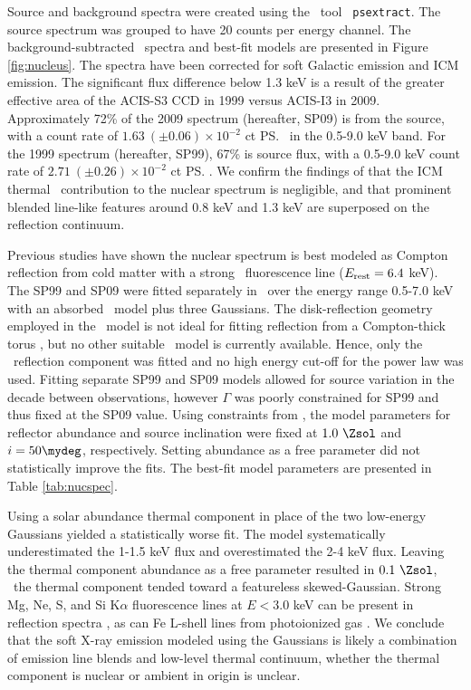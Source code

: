\documentclass[useAMS,usenatbib]{mn2e}
\begin{document}
Source and background spectra were created using the \ciao\ tool {\tt
  psextract}. The source spectrum was grouped to have 20 counts per
energy channel. The background-subtracted \chandra\ spectra and
best-fit models are presented in Figure \ref{fig:nucleus}. The spectra
have been corrected for soft Galactic emission and ICM emission. The
significant flux difference below 1.3 keV is a result of the greater
effective area of the ACIS-S3 CCD in 1999 versus ACIS-I3 in
2009. Approximately 72\% of the 2009 spectrum (hereafter, SP09) is
from the source, with a count rate of $1.63 ~(\pm 0.06) \times
10^{-2}$ ct \ps\ in the 0.5-9.0 keV band. For the 1999 spectrum
(hereafter, SP99), 67\% is source flux, with a 0.5-9.0 keV count rate
of $2.71 ~(\pm 0.26) \times 10^{-2}$ ct \ps. We confirm the findings
of \citet{2001MNRAS.321L..15I} that the ICM thermal
\feka\ contribution to the nuclear spectrum is negligible, and that
prominent blended line-like features around 0.8 keV and 1.3 keV are
superposed on the reflection continuum.

Previous studies have shown the nuclear spectrum is best modeled as
Compton reflection from cold matter with a strong \feka\ fluorescence
line ($E_{\rm{rest}} = 6.4$ keV). The SP99 and SP09 were fitted
separately in \xspec\ over the energy range 0.5-7.0 keV with an
absorbed \pexrav\ model \citep{pexrav} plus three Gaussians. The
disk-reflection geometry employed in the \pexrav\ model is not ideal
for fitting reflection from a Compton-thick torus
\citep{2009MNRAS.397.1549M}, but no other suitable \xspec\ model is
currently available. Hence, only the \pexrav\ reflection component was
fitted and no high energy cut-off for the power law was used. Fitting
separate SP99 and SP09 models allowed for source variation in the
decade between observations, however $\Gamma$ was poorly constrained
for SP99 and thus fixed at the SP09 value. Using constraints from
\citet{2000AJ....120..562T}, the model parameters for reflector
abundance and source inclination were fixed at $1.0 ~\Zsol$ and $i =
50\mydeg$, respectively. Setting abundance as a free parameter did not
statistically improve the fits. The best-fit model parameters are
presented in Table \ref{tab:nucspec}.

Using a solar abundance thermal component in place of the two
low-energy Gaussians yielded a statistically worse fit. The model
systematically underestimated the 1-1.5 keV flux and overestimated the
2-4 keV flux. Leaving the thermal component abundance as a free
parameter resulted in $0.1 ~\Zsol$, \ie\ the thermal component tended
toward a featureless skewed-Gaussian. Strong Mg, Ne, S, and Si
K$\alpha$ fluorescence lines at $E < 3.0$ keV can be present in
reflection spectra \citep{1991MNRAS.249..352G}, as can Fe L-shell
lines from photoionized gas \citep{1990ApJ...362...90B}. We conclude
that the soft X-ray emission modeled using the Gaussians is likely a
combination of emission line blends and low-level thermal continuum,
whether the thermal component is nuclear or ambient in origin is
unclear.
\end{document}
